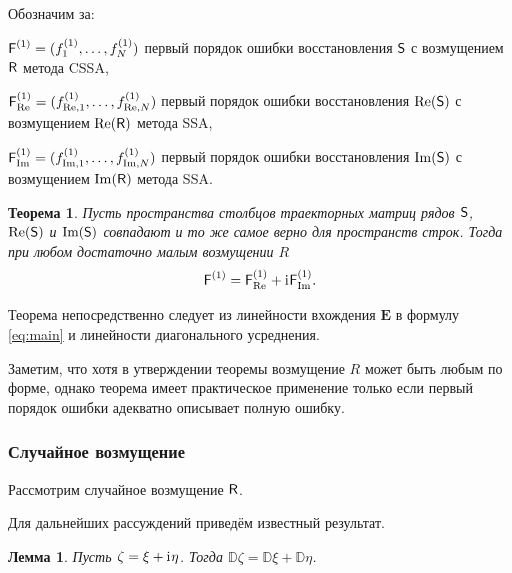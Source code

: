 \documentclass{spisok-article}
\newtheorem{theorem}{Теорема}%
\newtheorem{lemma}{Лемма}%
\begin{document}
Обозначим за:

$\textsf{F}^{(1)} = (f^{(1)}_1, \ldots, f^{(1)}_N)$ первый порядок ошибки восстановления $\textsf{S}$ с возмущением $\textsf{R}$ метода CSSA,

$\textsf{F}^{(1)}_{\Re} = (f^{(1)}_{\Re,1}, \ldots, f^{(1)}_{\Re, N})$ первый порядок ошибки восстановления $\Re(\textsf{S})$ с возмущением $\Re(\textsf{R})$ метода SSA,

$\textsf{F}^{(1)}_{\Im} = (f^{(1)}_{\Im,1}, \ldots, f^{(1)}_{\Im, N})$ первый порядок ошибки восстановления $\Im(\textsf{S})$ с возмущением $\Im(\textsf{R})$ метода SSA.


\begin{theorem}\label{th:sum}
Пусть пространства столбцов траекторных матриц рядов $\textsf{S}$, $\Re(\textsf{S})$ и $\Im(\textsf{S})$ совпадают и то же самое верно для пространств строк.
Тогда при любом достаточно малым возмущении $R$ $$\textsf{F}^{(1)} = \textsf{F}^{(1)}_{\Re} + \mathrm{i}\mkern1mu\textsf{F}^{(1)}_{\Im}.$$
\end{theorem}

Теорема непосредственно следует из линейности вхождения $\mathbf{E}$ в формулу \eqref{eq:main} и линейности диагонального усреднения.

Заметим, что хотя в утверждении теоремы возмущение $R$ может быть любым по форме, однако теорема имеет практическое применение только если первый порядок ошибки адекватно описывает полную ошибку.

\subsubsection{Случайное возмущение}

Рассмотрим случайное возмущение $\textsf{R}$.

Для дальнейших рассуждений приведём известный результат.
\begin{lemma} \label{std:disp}
Пусть $\zeta = \xi + \mathrm{i}\mkern1mu\eta$. Тогда $\mathbb{D}\zeta = \mathbb{D}\xi + \mathbb{D}\eta$.
\end{lemma}
\end{document}
